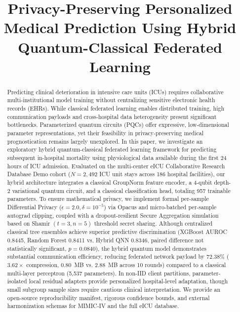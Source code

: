 \documentclass[conference]{IEEEtran}
\begin{document}
\title{Privacy-Preserving Personalized Medical Prediction Using Hybrid Quantum-Classical Federated Learning}

\author{
}

\maketitle

\begin{abstract}
Predicting clinical deterioration in intensive care units (ICUs) requires collaborative multi-institutional model training without centralizing sensitive electronic health records (EHRs). While classical federated learning enables distributed training, high communication payloads and cross-hospital data heterogeneity present significant bottlenecks. Parameterized quantum circuits (PQCs) offer expressive, low-dimensional parameter representations, yet their feasibility in privacy-preserving medical prognostication remains largely unexplored. In this paper, we investigate an exploratory hybrid quantum-classical federated learning framework for predicting subsequent in-hospital mortality using physiological data available during the first 24 hours of ICU admission. Evaluated on the multi-center eICU Collaborative Research Database Demo cohort ($N = 2,492$ ICU unit stays across 186 hospital facilities), our hybrid architecture integrates a classical GroupNorm feature encoder, a 4-qubit depth-2 variational quantum circuit, and a classical classification head, totaling 957 trainable parameters. To ensure mathematical privacy, we implement formal per-sample Differential Privacy ($\epsilon = 2.0, \delta = 10^{-5}$) via Opacus and micro-batched per-sample autograd clipping, coupled with a dropout-resilient Secure Aggregation simulation based on Shamir $(t=3, n=5)$ threshold secret sharing. Although centralized classical tree ensembles achieve superior predictive discrimination (XGBoost AUROC 0.8445, Random Forest 0.8411 vs. Hybrid QNN 0.8346, paired difference not statistically significant, $p = 0.0840$), the hybrid quantum model demonstrates substantial communication efficiency, reducing federated network payload by 72.38\% ($3.62\times$ compression, 0.80~MB vs. 2.88~MB across 10 rounds) compared to a classical multi-layer perceptron (5,537 parameters). In non-IID client partitions, parameter-isolated local residual adapters provide personalized hospital-level adaptation, though small subgroup sample sizes require cautious clinical interpretation. We provide an open-source reproducibility manifest, rigorous confidence bounds, and external harmonization schemas for MIMIC-IV and the full eICU database.
\end{abstract}
\end{document}
